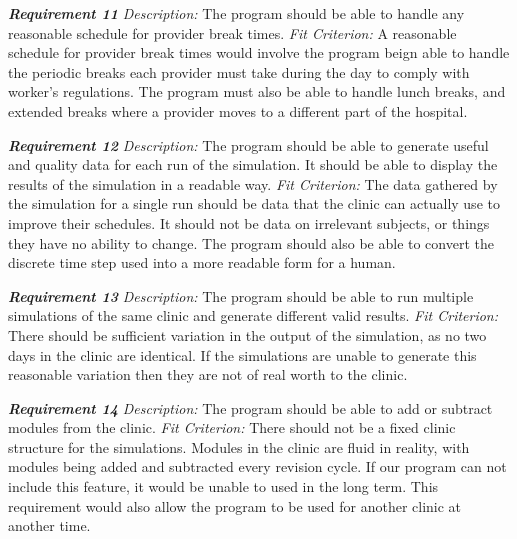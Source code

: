 \documentclass[12pt, titlepage]{article}
\begin{document}
\noindent\textbf{\textit{Requirement 11}}\newline
\textit{Description:}\newline
The program should be able to handle any reasonable schedule for provider break times.
\newline\newline
\textit{Fit Criterion:}\newline 
A reasonable schedule for provider break times would involve the program beign able to handle the periodic breaks each provider must take during the day to comply with worker's regulations. The program must also be able to handle lunch breaks, and extended breaks where a provider moves to a different part of the hospital.  \newline

\noindent\textbf{\textit{Requirement 12}}\newline
\textit{Description:}\newline
The program should be able to generate useful and quality data for each run of the simulation. It should be able to display the results of the simulation in a readable way.
\newline\newline
\textit{Fit Criterion:}\newline 
The data gathered by the simulation for a single run should be data that the clinic can actually use to improve their schedules. It should not be data on irrelevant subjects, or things they have no ability to change. The program should also be able to convert the discrete time step used into a more readable form for a human. \newline

\noindent\textbf{\textit{Requirement 13}}\newline
\textit{Description:}\newline
The program should be able to run multiple simulations of the same clinic and generate different valid results.
\newline\newline
\textit{Fit Criterion:}\newline 
There should be sufficient variation in the output of the simulation, as no two days in the clinic are identical. If the simulations are unable to generate this reasonable variation then they are not of real worth to the clinic.  \newline

\noindent\textbf{\textit{Requirement 14}}\newline
\textit{Description:}\newline
The program should be able to add or subtract modules from the clinic. 
\newline\newline
\textit{Fit Criterion:}\newline 
There should not be a fixed clinic structure for the simulations. Modules in the clinic are fluid in reality, with modules being added and subtracted every revision cycle. If our program can not include this feature, it would be unable to used in the long term. This requirement would also allow the program to be used for another clinic at another time.\newline
\end{document}
